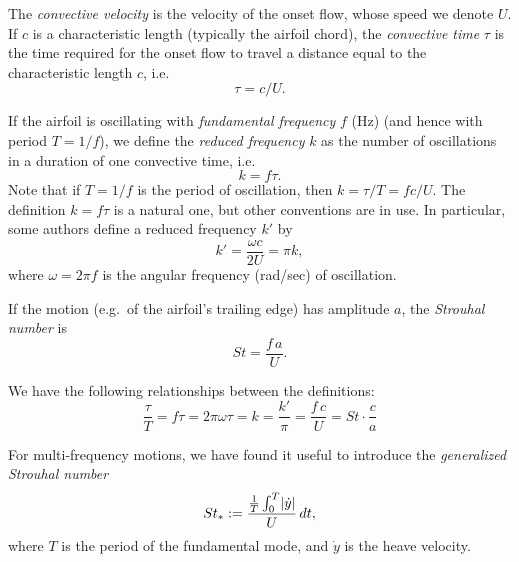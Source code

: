 \documentclass[10pt]{article}
\DeclarePairedDelimiter\abs{\lvert}{\rvert}
\newcommand\defn[1]{\emph{#1}}
\def\eg{e.g.~}
\def\ie{i.e.~}
\begin{document}
The \defn{convective velocity} is the velocity of the onset flow, whose speed we denote $U$.  If $c$ is a characteristic length (typically the airfoil chord), the \defn{convective time} $\tau$ is the time required for the onset flow to travel a distance equal to the characteristic length $c$, \ie \[\tau=c/U.\]  

If the airfoil is oscillating with \defn{fundamental frequency} $f$ (Hz) (and hence with period $T=1/f$), we define the \defn{reduced frequency} $k$ as the number of oscillations in a duration of one convective time, \ie \[k=f\tau.\]  Note that if $T=1/f$ is the period of oscillation, then $k=\tau/T=fc/U$. The definition $k=f\tau$ is a natural one, but other conventions are in use.  In particular, some authors define a reduced frequency $k'$ by \[k'=\frac{\omega c}{2U}=\pi k,\] where $\omega=2\pi f$ is the angular frequency (rad/sec) of oscillation.

If the motion (\eg of the airfoil's trailing edge) has amplitude $a$, the \defn{Strouhal number} is \[St = \frac{f\,a}{U}.\]

We have the following relationships between the definitions: \[\boxed{\frac{\tau}{T}=f\tau=2\pi\omega\tau=k=\frac{k'}{\pi}=\frac{f\,c}{U}=St\cdot\frac{c}{a}}\]

For multi-frequency motions, we have found it useful to introduce the \defn{generalized Strouhal number} \[St_* := \frac{\frac{1}{T}\int_0^T\abs{\dot y}}{U}\,dt,\] where $T$ is the period of the fundamental mode, and $\dot y$ is the heave velocity.
\end{document}
